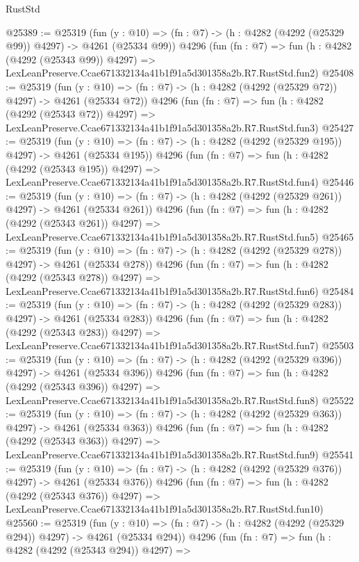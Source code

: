 \begin{lexlean}{RustStd}
\begin{coremodule}
@25389 := @25319
    (fun (y : @10) => (fn : @7) -> (h : @4282 (@4292 (@25329 @99)) @4297) -> @4261 (@25334 @99))
    @4296
    (fun (fn : @7) =>
    fun (h : @4282 (@4292 (@25343 @99)) @4297) =>
    LexLeanPreserve.Ccae671332134a41b1f91a5d301358a2b.R7.RustStd.fun2)
@25408 := @25319
    (fun (y : @10) => (fn : @7) -> (h : @4282 (@4292 (@25329 @72)) @4297) -> @4261 (@25334 @72))
    @4296
    (fun (fn : @7) =>
    fun (h : @4282 (@4292 (@25343 @72)) @4297) =>
    LexLeanPreserve.Ccae671332134a41b1f91a5d301358a2b.R7.RustStd.fun3)
@25427 := @25319
    (fun (y : @10) => (fn : @7) -> (h : @4282 (@4292 (@25329 @195)) @4297) -> @4261 (@25334 @195))
    @4296
    (fun (fn : @7) =>
    fun (h : @4282 (@4292 (@25343 @195)) @4297) =>
    LexLeanPreserve.Ccae671332134a41b1f91a5d301358a2b.R7.RustStd.fun4)
@25446 := @25319
    (fun (y : @10) => (fn : @7) -> (h : @4282 (@4292 (@25329 @261)) @4297) -> @4261 (@25334 @261))
    @4296
    (fun (fn : @7) =>
    fun (h : @4282 (@4292 (@25343 @261)) @4297) =>
    LexLeanPreserve.Ccae671332134a41b1f91a5d301358a2b.R7.RustStd.fun5)
@25465 := @25319
    (fun (y : @10) => (fn : @7) -> (h : @4282 (@4292 (@25329 @278)) @4297) -> @4261 (@25334 @278))
    @4296
    (fun (fn : @7) =>
    fun (h : @4282 (@4292 (@25343 @278)) @4297) =>
    LexLeanPreserve.Ccae671332134a41b1f91a5d301358a2b.R7.RustStd.fun6)
@25484 := @25319
    (fun (y : @10) => (fn : @7) -> (h : @4282 (@4292 (@25329 @283)) @4297) -> @4261 (@25334 @283))
    @4296
    (fun (fn : @7) =>
    fun (h : @4282 (@4292 (@25343 @283)) @4297) =>
    LexLeanPreserve.Ccae671332134a41b1f91a5d301358a2b.R7.RustStd.fun7)
@25503 := @25319
    (fun (y : @10) => (fn : @7) -> (h : @4282 (@4292 (@25329 @396)) @4297) -> @4261 (@25334 @396))
    @4296
    (fun (fn : @7) =>
    fun (h : @4282 (@4292 (@25343 @396)) @4297) =>
    LexLeanPreserve.Ccae671332134a41b1f91a5d301358a2b.R7.RustStd.fun8)
@25522 := @25319
    (fun (y : @10) => (fn : @7) -> (h : @4282 (@4292 (@25329 @363)) @4297) -> @4261 (@25334 @363))
    @4296
    (fun (fn : @7) =>
    fun (h : @4282 (@4292 (@25343 @363)) @4297) =>
    LexLeanPreserve.Ccae671332134a41b1f91a5d301358a2b.R7.RustStd.fun9)
@25541 := @25319
    (fun (y : @10) => (fn : @7) -> (h : @4282 (@4292 (@25329 @376)) @4297) -> @4261 (@25334 @376))
    @4296
    (fun (fn : @7) =>
    fun (h : @4282 (@4292 (@25343 @376)) @4297) =>
    LexLeanPreserve.Ccae671332134a41b1f91a5d301358a2b.R7.RustStd.fun10)
@25560 := @25319
    (fun (y : @10) => (fn : @7) -> (h : @4282 (@4292 (@25329 @294)) @4297) -> @4261 (@25334 @294))
    @4296
    (fun (fn : @7) =>
    fun (h : @4282 (@4292 (@25343 @294)) @4297) =>

\end{coremodule}
\end{lexlean}
